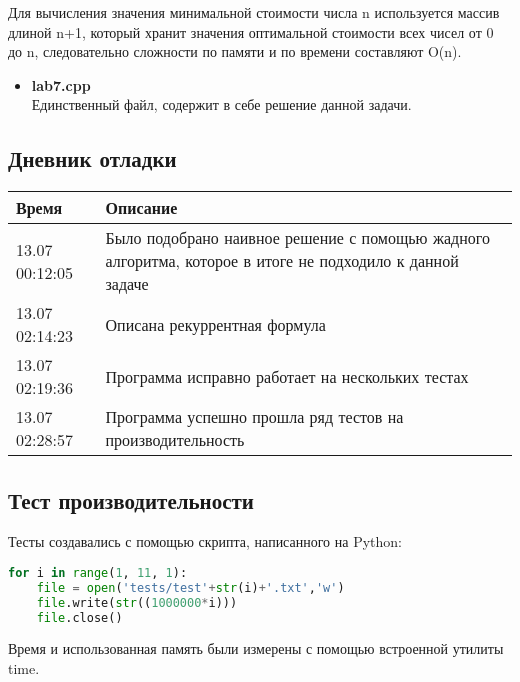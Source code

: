 \documentclass[12pt]{article}
\begin{document}
Для вычисления значения минимальной стоимости числа n используется массив длиной n+1, который хранит значения оптимальной стоимости всех чисел от 0 до n, следовательно сложности по памяти и по времени составляют O(n). 

\begin{itemize}
    \item \textbf{lab7.cpp}\\ 
    Единственный файл, содержит в себе решение данной задачи.
\end{itemize}

\subsection*{Дневник отладки}
\smallbreak
\noindent
\begin{tabular}{|l|p{13.2cm}|P{0.675\linewidth}|}
    \hline
    Время&  Описание \\ \hline
    13.07 00:12:05& Было подобрано наивное решение с помощью жадного алгоритма, которое в итоге не подходило к данной задаче\\ \hline
    13.07 02:14:23& Описана рекуррентная формула\\ \hline
    13.07 02:19:36& Программа исправно работает на нескольких тестах\\ \hline
    13.07 02:28:57& Программа успешно прошла ряд тестов на производительность\\ \hline
\end{tabular}
\smallbreak
\subsection*{Тест производительности}

Тесты создавались с помощью скрипта, написанного на Python:
\begin{lstlisting}[language=python]
for i in range(1, 11, 1):
    file = open('tests/test'+str(i)+'.txt','w')
    file.write(str((1000000*i)))
    file.close()
\end{lstlisting}

Время и использованная память были измерены с помощью встроенной утилиты time.\\

\end{document}
